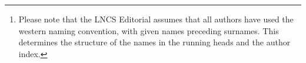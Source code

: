 \documentclass[runningheads,a4paper]{llncs}
\begin{document}
\mainmatter  %

\title{}


%
%
\author{Alfred Hofmann%
\thanks{Please note that the LNCS Editorial assumes that all authors have used
the western naming convention, with given names preceding surnames. This determines
the structure of the names in the running heads and the author index.}%
\and Ursula Barth\and Ingrid Haas\and Frank Holzwarth\and\\
Anna Kramer\and Leonie Kunz\and Christine Rei\ss\and\\
Nicole Sator\and Erika Siebert-Cole\and Peter Stra\ss er}
%


%
%

\maketitle


\begin{abstract}


\end{abstract}
\end{document}
